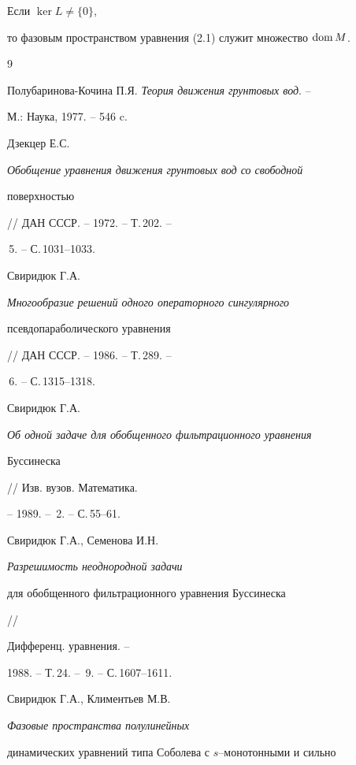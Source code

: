 \begin{notes}


Если $\ker L \neq \{0\}$,


то фазовым пространством уравнения (2.1) служит множество $\operatorname{dom} M$.


\end{notes}








\begin{thebibliography}{9}










Полубаринова-Кочина П.Я. {\it Теория движения грунтовых вод}. --


М.: Наука, 1977. -- 546 c.




Дзекцер Е.С. {\it Обобщение уравнения движения грунтовых вод со свободной


поверхностью} // ДАН СССР. -- 1972. -- Т.\,202. --


\No\,5. -- С.\,1031--1033.




Свиридюк Г.А. {\it Многообразие решений одного операторного сингулярного


псевдопараболического уравнения} // ДАН СССР. -- 1986. -- Т.\,289. --


\No\,6. -- С.\,1315--1318.




Свиридюк Г.А. {\it Об одной задаче для обобщенного фильтрационного уравнения


Буссинеска} // Изв. вузов. Математика.


-- 1989. -- \No\,2. -- С.\,55--61.




Свиридюк Г.А., Семенова И.Н. {\it Разрешимость неоднородной задачи


для обобщенного фильтрационного уравнения Буссинеска} //


Дифференц. уравнения. --


1988. -- Т.\,24. -- \No\,9. -- С.\,1607--1611.




Свиридюк Г.А., Климентьев М.В. {\it Фазовые пространства полулинейных


динамических уравнений типа Соболева с $s$--монотонными и сильно


}
\end{thebibliography}
